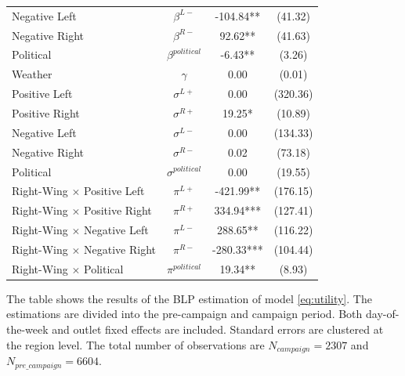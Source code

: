 \documentclass[12pt]{article}
\begin{document}
\begin{table}[ht]
\begin{threeparttable}
\begin{tabular}{lccc}
				Negative Left & $\beta^{L-}$ & -104.84** & (41.32) \\
				Negative Right & $\beta^{R-}$ & 92.62** & (41.63) \\
				Political & $\beta^{political}$ & -6.43** & (3.26) \\
				Weather & $\gamma$ & 0.00 & (0.01) \\
				\hline
				Positive Left & $\sigma^{L+}$ & 0.00 & (320.36) \\
				Positive Right & $\sigma^{R+}$ & 19.25* & (10.89) \\
				Negative Left & $\sigma^{L-}$ & 0.00 & (134.33) \\
				Negative Right & $\sigma^{R-}$ & 0.02 & (73.18) \\
				Political & $\sigma^{political}$ & 0.00 & (19.55) \\
				\hline
				Right-Wing $\times$  Positive Left & $\pi^{L+}$ & -421.99** & (176.15) \\
				Right-Wing $\times$  Positive Right & $\pi^{R+}$ & 334.94*** & (127.41) \\
				Right-Wing $\times$  Negative Left & $\pi^{L-}$ & 288.65** & (116.22) \\
				Right-Wing $\times$  Negative Right & $\pi^{R-}$ & -280.33*** & (104.44) \\
				Right-Wing $\times$  Political & $\pi^{political}$ & 19.34** & (8.93) \\
				\hline
				\hline
			\end{tabular}

			\begin{tablenotes}
				\small
				\item \footnotesize{The table shows the results of the BLP estimation of model \ref{eq:utility}. The estimations are divided into the pre-campaign and campaign period. Both day-of-the-week and outlet fixed effects are included. Standard errors are clustered at the region level. The total number of observations are $N_{campaign}=2307$ and  $N_{pre\_campaign}=6604$.}
			\end{tablenotes}
		\end{threeparttable}
	\end{table}
	
	
	
	
	
	
	
\end{document}
